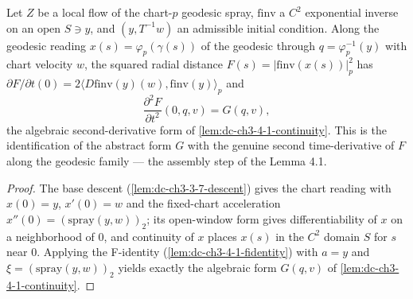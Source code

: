 \begin{lemma}
  \label{lem:dc-ch3-4-1-flowreading}


  Let $Z$ be a local flow of the chart-$p$ geodesic spray, $\mathrm{finv}$ a $C^2$ exponential
  inverse on an open $S\ni y$, and $(y,T^{-1}w)$ an admissible initial condition. Along the
  geodesic reading $x(s)=\varphi_p(\gamma(s))$ of the geodesic through $q=\varphi_p^{-1}(y)$
  with chart velocity $w$, the squared radial distance $F(s)=|\mathrm{finv}(x(s))|_p^2$ has
  $\partial F/\partial t(0)=2\langle D\mathrm{finv}(y)(w),\mathrm{finv}(y)\rangle_p$ and
  $$\frac{\partial^2 F}{\partial t^2}(0,q,v)=G(q,v),$$
  the algebraic second-derivative form of \cref{lem:dc-ch3-4-1-continuity}. This is the
  identification of the abstract form $G$ with the genuine second time-derivative of $F$ along
  the geodesic family — the assembly step of the Lemma 4.1.
\end{lemma}
\begin{proof}
  \sketch

  The base descent (\cref{lem:dc-ch3-3-7-descent}) gives the chart reading with $x(0)=y$,
  $x'(0)=w$ and the fixed-chart acceleration $x''(0)=(\mathrm{spray}(y,w))_2$; its open-window
  form gives differentiability of $x$ on a neighborhood of $0$, and continuity of $x$ places
  $x(s)$ in the $C^2$ domain $S$ for $s$ near $0$. Applying the F-identity
  (\cref{lem:dc-ch3-4-1-fidentity}) with $a=y$ and $\xi=(\mathrm{spray}(y,w))_2$ yields exactly
  the algebraic form $G(q,v)$ of \cref{lem:dc-ch3-4-1-continuity}.
\end{proof}

